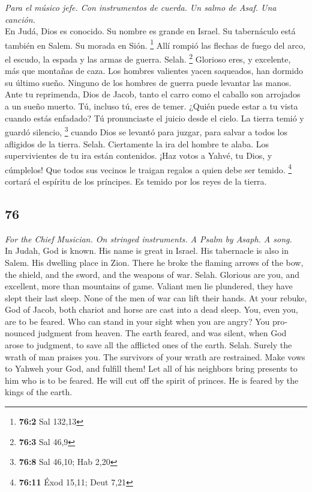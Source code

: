 \begin{paracol}{2}
\emph{Para el músico jefe. Con instrumentos de cuerda. Un salmo de Asaf.
Una canción.}\\
 En Judá, Dios es conocido. Su nombre es grande en Israel.
 Su tabernáculo está también en Salem. Su morada en Sión.
\footnote{\textbf{76:2} Sal 132,13}  Allí rompió las
flechas de fuego del arco, el escudo, la espada y las armas de guerra.
Selah. \footnote{\textbf{76:3} Sal 46,9}  Glorioso eres, y
excelente, más que montañas de caza.  Los hombres
valientes yacen saqueados, han dormido su último sueño. Ninguno de los
hombres de guerra puede levantar las manos.  Ante tu
reprimenda, Dios de Jacob, tanto el carro como el caballo son arrojados
a un sueño muerto.  Tú, incluso tú, eres de temer. ¿Quién
puede estar a tu vista cuando estás enfadado?  Tú
pronunciaste el juicio desde el cielo. La tierra temió y guardó
silencio, \footnote{\textbf{76:8} Sal 46,10; Hab 2,20} 
cuando Dios se levantó para juzgar, para salvar a todos los afligidos de
la tierra. Selah.  Ciertamente la ira del hombre te
alaba. Los supervivientes de tu ira están contenidos. 
¡Haz votos a Yahvé, tu Dios, y cúmplelos! Que todos sus vecinos le
traigan regalos a quien debe ser temido. \footnote{\textbf{76:11} Éxod
  15,11; Deut 7,21}  cortará el espíritu de los
príncipes. Es temido por los reyes de la tierra.

\switchcolumn
\begin{otherlanguage}{english}

\hypertarget{section-151}{%
\section{76}\label{section-151}}

\emph{For the Chief Musician. On stringed instruments. A Psalm by Asaph.
A song.}\\
 In Judah, God is known. His name is great in Israel.
 His tabernacle is also in Salem. His dwelling place in
Zion.  There he broke the flaming arrows of the bow, the
shield, and the sword, and the weapons of war. Selah. 
Glorious are you, and excellent, more than mountains of game.
 Valiant men lie plundered, they have slept their last
sleep. None of the men of war can lift their hands.  At
your rebuke, God of Jacob, both chariot and horse are cast into a dead
sleep.  You, even you, are to be feared. Who can stand in
your sight when you are angry?  You pronounced judgment
from heaven. The earth feared, and was silent,  when God
arose to judgment, to save all the afflicted ones of the earth. Selah.
 Surely the wrath of man praises you. The survivors of
your wrath are restrained.  Make vows to Yahweh your God,
and fulfill them! Let all of his neighbors bring presents to him who is
to be feared.  He will cut off the spirit of princes. He
is feared by the kings of the earth.


\end{otherlanguage}
\end{paracol}
